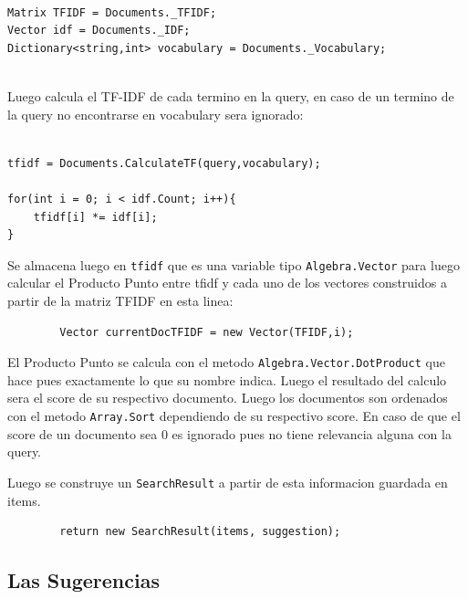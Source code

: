 \documentclass[10pt,a4paper]{report}
\begin{document}
\begin{flushleft}
    \begin{verbatim}
        
Matrix TFIDF = Documents._TFIDF;
Vector idf = Documents._IDF;
Dictionary<string,int> vocabulary = Documents._Vocabulary;
    
    \end{verbatim}

    Luego calcula el TF-IDF de cada termino en la query, en caso de un termino de la query no encontrarse en vocabulary sera ignorado:

    \begin{verbatim}
        
tfidf = Documents.CalculateTF(query,vocabulary);

for(int i = 0; i < idf.Count; i++){
    tfidf[i] *= idf[i];
}

    \end{verbatim}

    Se almacena luego en \texttt{tfidf} que es una variable tipo \texttt{Algebra.Vector} para luego calcular el Producto Punto entre tfidf y  cada uno de los vectores construidos a partir de la matriz TFIDF en esta linea:

    \begin{verbatim}
        Vector currentDocTFIDF = new Vector(TFIDF,i);
    \end{verbatim}

    El Producto Punto se calcula con el metodo \texttt{Algebra.Vector.DotProduct} que hace pues exactamente lo que su nombre indica. Luego el resultado del calculo sera el score de su respectivo documento. Luego los documentos son ordenados con el metodo \texttt{Array.Sort} dependiendo de su respectivo score. En caso de que el score de un documento sea 0 es ignorado pues no tiene relevancia alguna con la query.

    Luego se construye un \texttt{SearchResult} a partir de esta informacion guardada en items.
    
    \begin{verbatim}
        return new SearchResult(items, suggestion);
    \end{verbatim}

    \subsection{Las Sugerencias}

    \begin{flushleft}
    

\end{flushleft}
\end{flushleft}
\end{document}
